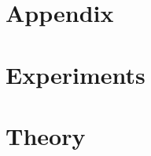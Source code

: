 \section*{Appendix}


\startcontents[appendix]
\newpage

\section{Experiments}
\label{app:expt}

\newpage

\section{Theory}
\label{app:extended_theory}


\stopcontents[appendix]
